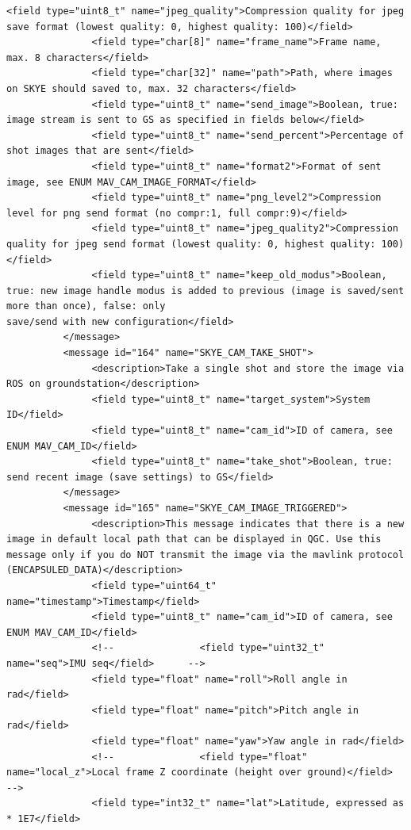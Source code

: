 \begin{lstlisting}[captionpos=b, caption="Definition of \textsc{Skye} specific Mavlink messages", label=app_xml]
               <field type="uint8_t" name="jpeg_quality">Compression quality for jpeg save format (lowest quality: 0, highest quality: 100)</field>
               <field type="char[8]" name="frame_name">Frame name, max. 8 characters</field>
               <field type="char[32]" name="path">Path, where images on SKYE should saved to, max. 32 characters</field>
               <field type="uint8_t" name="send_image">Boolean, true: image stream is sent to GS as specified in fields below</field>
               <field type="uint8_t" name="send_percent">Percentage of shot images that are sent</field>
               <field type="uint8_t" name="format2">Format of sent image, see ENUM MAV_CAM_IMAGE_FORMAT</field>
               <field type="uint8_t" name="png_level2">Compression level for png send format (no compr:1, full compr:9)</field>
               <field type="uint8_t" name="jpeg_quality2">Compression quality for jpeg send format (lowest quality: 0, highest quality: 100)</field>
               <field type="uint8_t" name="keep_old_modus">Boolean, true: new image handle modus is added to previous (image is saved/sent more than once), false: only 
save/send with new configuration</field>
          </message>
          <message id="164" name="SKYE_CAM_TAKE_SHOT">
               <description>Take a single shot and store the image via ROS on groundstation</description>
               <field type="uint8_t" name="target_system">System ID</field>
               <field type="uint8_t" name="cam_id">ID of camera, see ENUM MAV_CAM_ID</field>
               <field type="uint8_t" name="take_shot">Boolean, true: send recent image (save settings) to GS</field>
          </message>
          <message id="165" name="SKYE_CAM_IMAGE_TRIGGERED">
               <description>This message indicates that there is a new image in default local path that can be displayed in QGC. Use this message only if you do NOT transmit the image via the mavlink protocol (ENCAPSULED_DATA)</description>
               <field type="uint64_t" name="timestamp">Timestamp</field>
               <field type="uint8_t" name="cam_id">ID of camera, see ENUM MAV_CAM_ID</field>
               <!--               <field type="uint32_t" name="seq">IMU seq</field>      -->
               <field type="float" name="roll">Roll angle in rad</field>
               <field type="float" name="pitch">Pitch angle in rad</field>
               <field type="float" name="yaw">Yaw angle in rad</field>
               <!--               <field type="float" name="local_z">Local frame Z coordinate (height over ground)</field>   -->
               <field type="int32_t" name="lat">Latitude, expressed as * 1E7</field>

\end{lstlisting}
